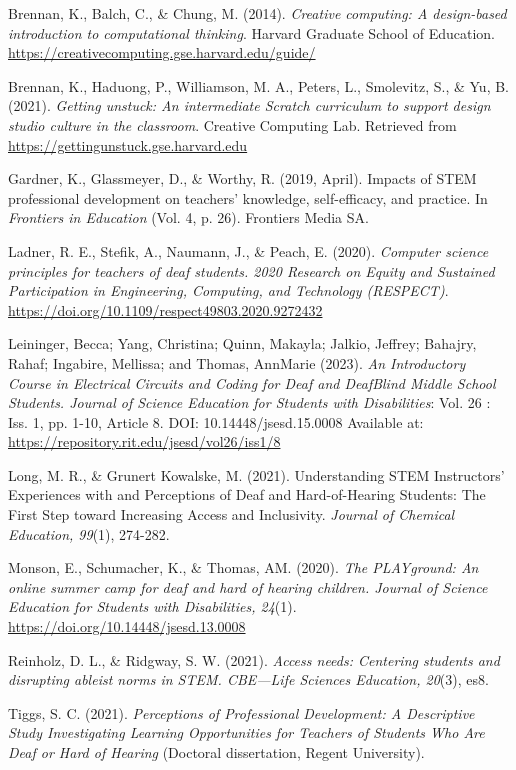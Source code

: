 \documentclass[11.5pt]{sig-alternate} %
\begin{document}
Brennan, K., Balch, C., \& Chung, M. (2014). \textit{Creative computing: A design-based introduction to computational thinking}. Harvard Graduate School of Education. \url{https://creativecomputing.gse.harvard.edu/guide/}

Brennan, K., Haduong, P., Williamson, M. A., Peters, L., Smolevitz, S., \& Yu, B. (2021). \textit{Getting unstuck: An intermediate Scratch curriculum to support design studio culture in the classroom}. Creative Computing Lab. Retrieved from \url{https://gettingunstuck.gse.harvard.edu}

Gardner, K., Glassmeyer, D., \& Worthy, R. (2019, April). Impacts of STEM professional development on teachers' knowledge, self-efficacy, and practice. In \textit{Frontiers in Education} (Vol. 4, p. 26). Frontiers Media SA.

Ladner, R. E., Stefik, A., Naumann, J., \& Peach, E. (2020). \textit{Computer science principles for teachers of deaf students. 2020 Research on Equity and Sustained Participation in Engineering, Computing, and Technology (RESPECT)}. \url{https://doi.org/10.1109/respect49803.2020.9272432}

Leininger, Becca; Yang, Christina; Quinn, Makayla; Jalkio, Jeffrey; Bahajry, Rahaf; Ingabire, Mellissa; and Thomas, AnnMarie (2023). \textit{An Introductory Course in Electrical Circuits and Coding for Deaf and DeafBlind Middle School Students. Journal of Science Education for Students with Disabilities}: Vol. 26 : Iss. 1, pp. 1-10, Article 8. DOI: 10.14448/jsesd.15.0008 Available at: \url{https://repository.rit.edu/jsesd/vol26/iss1/8}

Long, M. R., \& Grunert Kowalske, M. (2021). Understanding STEM Instructors’ Experiences with and Perceptions of Deaf and Hard-of-Hearing Students: The First Step toward Increasing Access and Inclusivity. \textit{Journal of Chemical Education, 99}(1), 274-282.

Monson, E., Schumacher, K., \& Thomas, AM. (2020). \textit{The PLAYground: An online summer camp for deaf and hard of hearing children. Journal of Science Education for Students with Disabilities, 24}(1). \url{https://doi.org/10.14448/jsesd.13.0008}

Reinholz, D. L., \& Ridgway, S. W. (2021). \textit{Access needs: Centering students and disrupting ableist norms in STEM. CBE—Life Sciences Education, 20}(3), es8. 

Tiggs, S. C. (2021). \textit{Perceptions of Professional Development: A Descriptive Study Investigating Learning Opportunities for Teachers of Students Who Are Deaf or Hard of Hearing} (Doctoral dissertation, Regent University).
\end{document}
